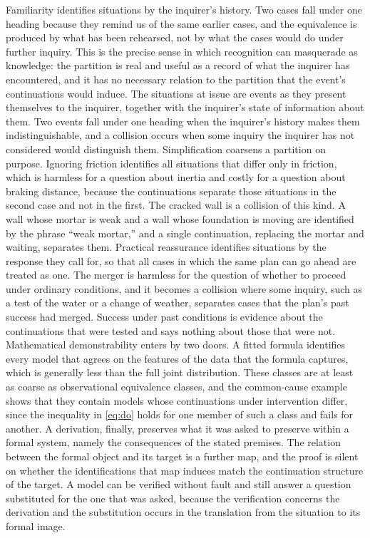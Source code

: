 \documentclass[11pt,letterpaper]{article}
\theoremstyle{definition}
\begin{document}
Familiarity identifies situations by the inquirer's history. Two cases fall under one heading because they remind us of the same earlier cases, and the equivalence is produced by what has been rehearsed, not by what the cases would do under further inquiry. This is the precise sense in which recognition can masquerade as knowledge: the partition is real and useful as a record of what the inquirer has encountered, and it has no necessary relation to the partition that the event's continuations would induce. The situations at issue are events as they present themselves to the inquirer, together with the inquirer's state of information about them. Two events fall under one heading when the inquirer's history makes them indistinguishable, and a collision occurs when some inquiry the inquirer has not considered would distinguish them. Simplification coarsens a partition on purpose. Ignoring friction identifies all situations that differ only in friction, which is harmless for a question about inertia and costly for a question about braking distance, because the continuations separate those situations in the second case and not in the first. The cracked wall is a collision of this kind. A wall whose mortar is weak and a wall whose foundation is moving are identified by the phrase ``weak mortar,'' and a single continuation, replacing the mortar and waiting, separates them. Practical reassurance identifies situations by the response they call for, so that all cases in which the same plan can go ahead are treated as one. The merger is harmless for the question of whether to proceed under ordinary conditions, and it becomes a collision where some inquiry, such as a test of the water or a change of weather, separates cases that the plan's past success had merged. Success under past conditions is evidence about the continuations that were tested and says nothing about those that were not. Mathematical demonstrability enters by two doors. A fitted formula identifies every model that agrees on the features of the data that the formula captures, which is generally less than the full joint distribution. These classes are at least as coarse as observational equivalence classes, and the common-cause example shows that they contain models whose continuations under intervention differ, since the inequality in \eqref{eq:do} holds for one member of such a class and fails for another. A derivation, finally, preserves what it was asked to preserve within a formal system, namely the consequences of the stated premises. The relation between the formal object and its target is a further map, and the proof is silent on whether the identifications that map induces match the continuation structure of the target. A model can be verified without fault and still answer a question substituted for the one that was asked, because the verification concerns the derivation and the substitution occurs in the translation from the situation to its formal image.
\end{document}
